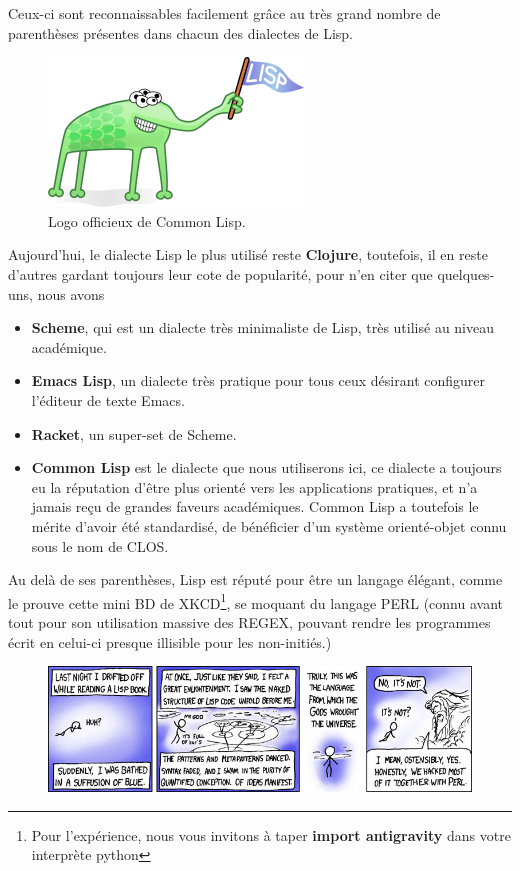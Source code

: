 \documentclass[a4paper, 12pt]{article}
\numberwithin{equation}{subsection}
\begin{document}
Ceux-ci sont reconnaissables facilement grâce au très grand nombre de parenthèses présentes dans chacun des dialectes de Lisp. \\
\begin{figure}
  \includegraphics[scale=0.5]{imgs/Lisplogo_alien_256.png}
  \caption{Logo officieux de Common Lisp.}
\end{figure}

Aujourd'hui, le dialecte Lisp le plus utilisé reste {\bf Clojure}, toutefois, il en reste d'autres gardant toujours leur cote de popularité, pour n'en citer que quelques-uns, nous avons

\begin{itemize}
  \item {\bf Scheme}, qui est un dialecte très minimaliste de Lisp, très utilisé au niveau académique.
  \item {\bf Emacs Lisp}, un dialecte très pratique pour tous ceux désirant configurer l'éditeur de texte Emacs.
  \item {\bf Racket}, un super-set de Scheme.
  \item {\bf Common Lisp} est le dialecte que nous utiliserons ici, ce dialecte a toujours eu la réputation d'être plus orienté vers les applications pratiques, et n'a jamais reçu de grandes faveurs académiques. Common Lisp a toutefois le mérite d'avoir été standardisé, de bénéficier d'un système orienté-objet connu sous le nom de CLOS.
\end{itemize}
Au delà de ses parenthèses, Lisp est réputé pour être un langage élégant, comme le prouve cette mini BD de XKCD\footnote{Pour l'expérience, nous vous invitons à taper {\bf import antigravity} dans votre interprète python}, se moquant du langage PERL (connu avant tout pour son utilisation massive des REGEX, pouvant rendre les programmes écrit en celui-ci presque illisible pour les non-initiés.)
\begin{figure}[H]
  \centering
  \includegraphics[scale=4]{imgs/lisp.jpeg}
\end{figure}
\end{document}
